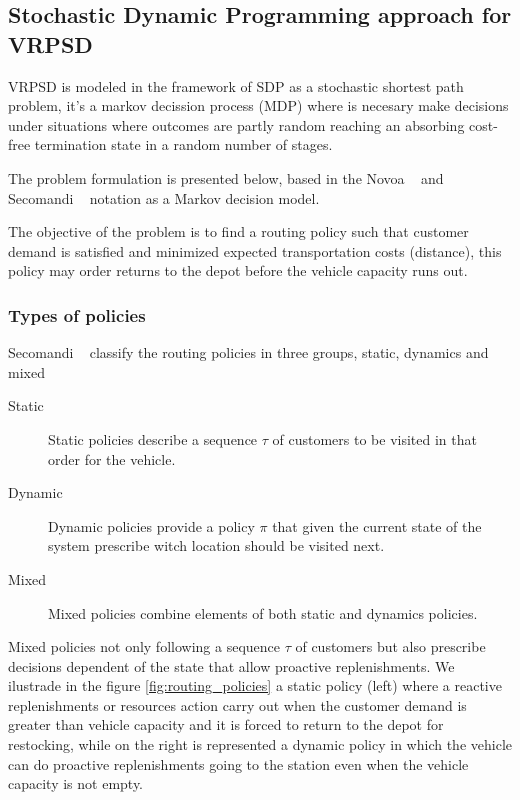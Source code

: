 
\subsection{Stochastic Dynamic Programming approach for VRPSD}\label{sec:SDP_model_VRPSD}

VRPSD is modeled in the framework of SDP as a stochastic shortest path problem, it's a markov decission process (MDP) where is necesary make decisions under situations where outcomes are partly random reaching an absorbing cost-free termination state in a random number of stages.

The problem formulation is presented below, based in the Novoa ~\cite{novoa_approximate_2009} and Secomandi ~\cite{secomandi_rollout_2001} notation as a Markov decision model.

The objective of the problem is to find a routing policy such that customer demand is satisfied and minimized expected transportation costs (distance), this policy may order returns to the depot before the vehicle capacity runs out.

\subsubsection{Types of policies}

Secomandi ~\cite{secomandi_comparing_2000} classify the routing policies in three groups, static, dynamics and mixed

\begin{description}
  \item[Static] Static policies describe a sequence $\tau$ of customers to be visited in that order for the vehicle.
  \item[Dynamic] Dynamic policies provide a policy $\pi$ that given the current state of the system prescribe witch location should be visited next.
  \item[Mixed] Mixed policies combine elements of both static and dynamics policies.
\end{description}

Mixed policies not only following a sequence $\tau$ of customers but also prescribe decisions dependent of the state that allow proactive replenishments. We ilustrade in the figure \ref{fig:routing_policies} a static policy (left) where a reactive replenishments or resources action carry out when the customer demand is greater than vehicle capacity and it is forced to return to the depot for restocking, while on the right is represented a dynamic policy in which the vehicle can do proactive replenishments going to the station even when the vehicle capacity is not empty.

